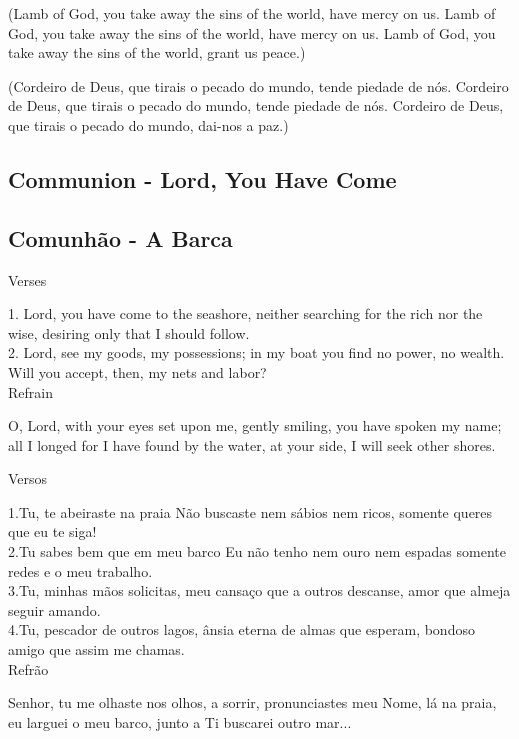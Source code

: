 \documentclass[10pt,a5]{article}
\newcommand \subsect[2] {\subsection*{#1} \switchcolumn \subsection*{#2} \switchcolumn*}
\begin{document}
\begin{paracol}{2}

(Lamb of God, you take away the sins of the world, have mercy on us.
Lamb of God, you take away the sins of the world, have mercy on us.
Lamb of God, you take away the sins of the world, grant us peace.)

\switchcolumn

(Cordeiro de Deus, que tirais o pecado do mundo, tende piedade de nós.
Cordeiro de Deus, que tirais o pecado do mundo, tende piedade de nós.
Cordeiro de Deus, que tirais o pecado do mundo, dai-nos a paz.)

\switchcolumn*

 \subsect{Communion - Lord, You Have Come}{Comunh\~ao - A Barca}

Verses

1. Lord, you have come to the seashore,
neither searching for the rich nor the wise,
desiring only that I should follow.\\

2. Lord, see my goods, my possessions;
in my boat you find no power, no wealth.
Will you accept, then, my nets and labor? \\

Refrain

O, Lord, with your eyes set upon me,
gently smiling, you have spoken my name;
all I longed for I have found by the water,
at your side, I will seek other shores.

\switchcolumn

Versos

1.Tu, te abeiraste na praia
Não buscaste nem sábios nem ricos,
somente queres que eu te siga!\\

2.Tu sabes bem que em meu barco
Eu não tenho nem ouro nem espadas
somente redes e o meu trabalho.\\

3.Tu, minhas mãos solicitas,
meu cansaço que a outros descanse,
amor que almeja seguir amando.\\

4.Tu, pescador de outros lagos,
ânsia eterna de almas que esperam,
bondoso amigo que assim me chamas.\\

Refr\~ao

Senhor, tu me olhaste nos olhos,
a sorrir, pronunciastes meu Nome,
lá na praia, eu larguei o meu barco,
junto a Ti buscarei outro mar...

\switchcolumn*


\end{paracol}
\end{document}
